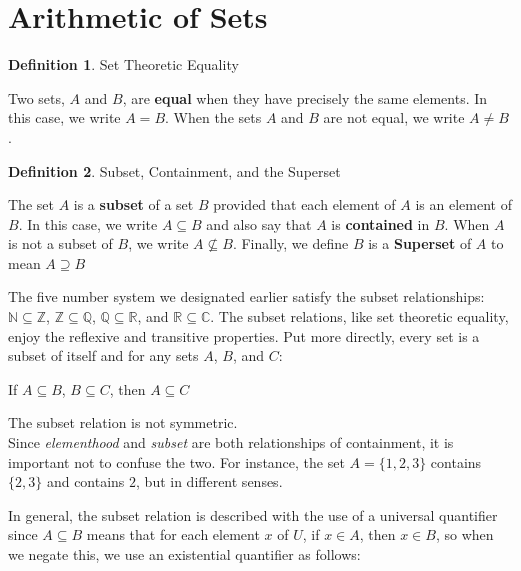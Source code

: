 \documentclass{book}
\theoremstyle{definition}
\newtheorem{definition}{Definition}[section]
\theoremstyle{remark}
\newcommand{\bb}[1]{\mathbb{#1}}
\begin{document}
\newpage
\section{Arithmetic of Sets}

\begin{definition}
Set Theoretic Equality \\
    \begin{tcolorbox}
        Two sets, $A$ and $B$, are {\bf equal} when they have precisely the same elements. In this case, we write $A = B$. When the sets $A$ and $B$ are not equal, we write $A \neq B$. 
    \end{tcolorbox}
\end{definition}
    

\begin{definition}
Subset, Containment, and the Superset \\
    
    \begin{tcolorbox}
        The set $A$ is a {\bf subset} of a set $B$ provided that each element of $A$ is an  element of $B$. In this case, we write $A \subseteq B$ and also say that $A$ is {\bf contained} in $B$. When $A$ is not a subset of $B$, we write $A \nsubseteq B$. Finally, we define $B$ is a \textbf{Superset} of $A$ to mean $A \supseteq B$ 
    \end{tcolorbox}
    
    The five number system we designated earlier satisfy the subset relationships: $\bb{N} \subseteq \bb{Z}$, $\bb{Z} \subseteq \mathbb{Q}$, $\mathbb{Q} \subseteq \bb{R}$, and $\bb{R} \subseteq \bb{C}$. The subset relations, like set theoretic equality, enjoy the reflexive and transitive properties. Put more directly, every set is a subset of itself and for any sets $A$, $B$, and $C$:
        \begin{center}
            If $A \subseteq B$, $B \subseteq C$, then $A \subseteq C$
        \end{center}
    The subset relation is not symmetric. \\
    
    Since \textit{elementhood} and \textit{subset} are both relationships of containment, it is important not to confuse the two. For instance, the set $A = \{ 1, 2 , 3 \}$ contains $\{ 2, 3 \}$ and contains $2$, but in different senses. 
    
    In general, the subset relation is described with the use of a universal quantifier since $A \subseteq B$ means that for each element $x$ of $U$, if $x \in A$, then $x \in B$, so when we negate this, we use an existential quantifier  as follows: 
    

\end{definition}
\end{document}
